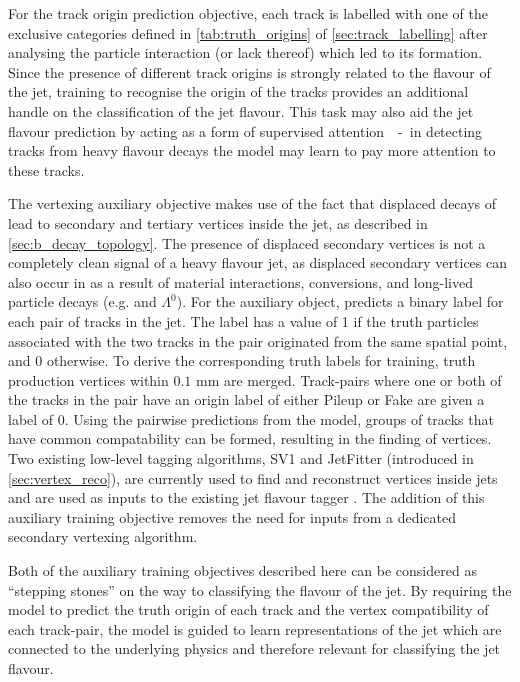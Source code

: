 For the track origin prediction objective, each track is labelled with one of the exclusive categories defined in \cref{tab:truth_origins} of \cref{sec:track_labelling} after analysing the particle interaction (or lack thereof) which led to its formation. 
Since the presence of different track origins is strongly related to the flavour of the jet, training \GNN to recognise the origin of the tracks provides an additional handle on the classification of the jet flavour.
This task may also aid the jet flavour prediction by acting as a form of supervised attention~\cite{arxiv.2007.08294}~-~in detecting tracks from heavy flavour decays the model may learn to pay more attention to these tracks.

The vertexing auxiliary objective makes use of the fact that displaced decays of \bchadrons lead to secondary and tertiary vertices inside the jet, as described in \cref{sec:b_decay_topology}.
The presence of displaced secondary vertices is not a completely clean signal of a heavy flavour jet, as displaced secondary vertices can also occur in \ljets as a result of material interactions, conversions, and long-lived particle decays (e.g. \Kshort and $\Lambda^0$).
For the auxiliary object, \GNN predicts a binary label for each pair of tracks in the jet.
The label has a value of 1 if the truth particles associated with the two tracks in the pair originated from the same spatial point, and 0 otherwise. 
To derive the corresponding truth labels for training, truth production vertices within $0.1$ mm are merged.%
Track-pairs where one or both of the tracks in the pair have an origin label of either Pileup or Fake are given a label of 0.
Using the pairwise predictions from the model, groups of tracks that have common compatability can be formed, resulting in the finding of vertices.
Two existing low-level tagging algorithms, SV1 and JetFitter (introduced in \cref{sec:vertex_reco}), are currently used to find and reconstruct vertices inside jets and are used as inputs to the existing jet flavour tagger \DLr.
The addition of this auxiliary training objective removes the need for inputs from a dedicated secondary vertexing algorithm.

Both of the auxiliary training objectives described here can be considered as ``stepping stones'' on the way to classifying the flavour of the jet. 
By requiring the model to predict the truth origin of each track and the vertex compatibility of each track-pair, the model is guided to learn representations of the jet which are connected to the underlying physics and therefore relevant for classifying the jet flavour. 


